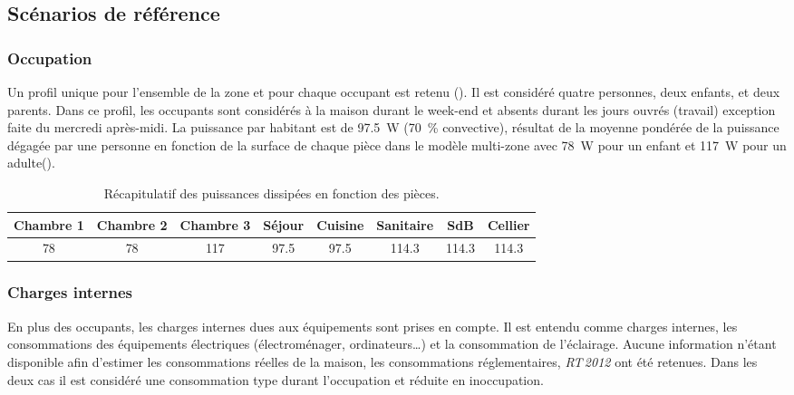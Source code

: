 \subsection{Scénarios de référence} %
\label{sub:scenarios_de_reference}
\subsubsection{Occupation} %
\label{ssub:profil_d_occupation}
Un profil unique pour l’ensemble de la zone et pour chaque occupant est retenu
(). Il est considéré quatre personnes, deux enfants, et
deux parents. Dans ce profil, les occupants sont considérés à la maison durant le week-end
et absents durant les jours ouvrés (travail) exception faite du mercredi après-midi. La
puissance par habitant est de \SI{97.5}{\watt} (\SI{70}{\percent} convective), résultat de
la moyenne pondérée de la puissance dégagée par une personne en fonction de la surface de
chaque pièce dans le modèle multi-zone avec \SI{78}{\watt} pour un enfant et \SI{117}{\watt}
pour un adulte().

\begin{table}
\centering
\caption[Récapitulatif des puissances dissipées en fonction des pièces]
        {Récapitulatif des puissances dissipées en fonction des pièces.}
\label{tab:puissance_occupants}
\begin{tabular}{*8{c}}
    \toprule
    Chambre 1 & Chambre 2  & Chambre 3 & Séjour     & Cuisine    & Sanitaire   & SdB         & Cellier     \\
    \midrule
    \num{78}  & \num{78}   & \num{117} & \num{97.5} & \num{97.5} & \num{114.3} & \num{114.3} & \num{114.3} \\
    \bottomrule
\end{tabular}
\end{table}


\subsubsection{Charges internes} %
\label{ssub:charges_internes}
En plus des occupants, les charges internes dues aux équipements sont prises en compte. Il
est entendu comme charges internes, les consommations des équipements électriques
(électroménager, ordinateurs\dots) et la consommation de l’éclairage. Aucune information
n’étant disponible afin d’estimer les consommations réelles de la maison, les
consommations réglementaires, \textit{RT\,2012} \parencite{CSTB2011} ont été retenues.
Dans les deux cas il est considéré une consommation type durant l’occupation
et réduite en inoccupation.

